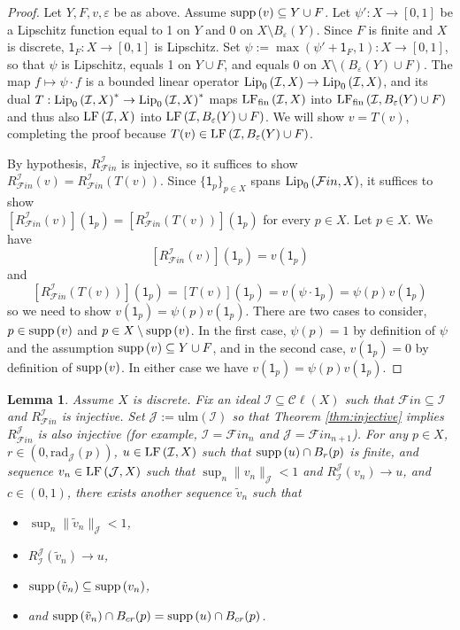 \documentclass[12pt]{amsart}
\newtheorem{lemma}[theorem]{Lemma}
\theoremstyle{definition}
\numberwithin{equation}{section}
\def \F {\mathcal{F}in}
\def \I {\mathcal{I}}
\def \J {\mathcal{J}}
\def \sbs {\subseteq}
\def \eps {\varepsilon}
\def \one {\mathsf{1}}
\newcommand{\Cl}[1]{\mathcal{C}\ell\left(#1\right)}
\newcommand{\rad}[2]{\mathrm{rad}_{#1}\left(#2\right)}
\newcommand{\ulm}[1]{\mathrm{ulm}\left(#1\right)}
\begin{document}
\begin{proof}
Let $Y,F,v,\eps$ be as above. Assume $\supp{v} \sbs Y \cup F$. Let $\psi': X \to [0,1]$ be a Lipschitz function equal to 1 on $Y$ and 0 on $X \setminus B_{\eps}(Y)$. Since $F$ is finite and $X$ is discrete, $\one_F: X \to [0,1]$ is Lipschitz. Set $\psi := \max(\psi'+\one_F,1): X \to [0,1]$, so that $\psi$ is Lipschitz, equals 1 on $Y \cup F$, and equals 0 on $X \setminus (B_{\eps}(Y) \cup F)$. The map $f \mapsto \psi \cdot f$ is a bounded linear operator $\Lip{\I}{X} \to \Lip{\I}{X}$, and its dual $T: \Lip{\I}{X}^* \to \Lip{\I}{X}^*$ maps $\LFf{\I}{X}$ into $\LFf{\I}{B_{\eps}(Y) \cup F}$ and thus also $\LF{\I}{X}$ into $\LF{\I}{B_{\eps}(Y) \cup F}$. We will show $v = T(v)$, completing the proof because $T(v) \in \LF{\I}{B_{\eps}(Y) \cup F}$.

By hypothesis, $R^\I_{\F}$ is injective, so it suffices to show $R^\I_{\F}(v) = R^\I_{\F}(T(v))$. Since $\{\one_p\}_{p \in X}$ spans $\Lip{\F}{X}$, it suffices to show \\ $[R^\I_{\F}(v)](\one_p) = [R^\I_{\F}(T(v))](\one_p)$ for every $p \in X$. Let $p \in X$. We have
$$[R^\I_{\F}(v)](\one_p) = v(\one_p)$$
and
$$[R^\I_{\F}(T(v))](\one_p) = [T(v)](\one_p) = v(\psi \cdot \one_p) = \psi(p)v(\one_p)$$
so we need to show $v(\one_p) = \psi(p)v(\one_p)$. There are two cases to consider, $p \in \supp{v}$ and $p \in X \setminus \supp{v}$. In the first case, $\psi(p) = 1$ by definition of $\psi$ and the assumption $\supp{v} \sbs Y \cup F$, and in the second case, $v(\one_p) = 0$ by definition of $\supp{v}$. In either case we have $v(\one_p) = \psi(p)v(\one_p)$.
\end{proof}

\begin{lemma} \label{lem:sequence1}
Assume $X$ is discrete. Fix an ideal $\I \sbs \Cl{X}$ such that $\F \sbs \I$ and $R^\I_{\F}$ is injective. Set $\J := \ulm{\I}$ so that Theorem \ref{thm:injective} implies $R^\J_{\F}$ is also injective (for example, $\I = \F_n$ and $\J = \F_{n+1}$). For any $p \in X$, $r \in (0,\rad{\J}{p})$, $u \in \LF{\I}{X}$ such that $\supp{u} \cap B_{r}(p)$ is finite, and sequence $v_n \in \LF{\J}{X}$ such that $\sup_n \|v_n\|_\J < 1$ and $R^\J_\I(v_n) \to u$, and $c \in (0,1)$, there exists another sequence $\tilde{v}_n$ such that
\begin{itemize}
\item $\sup_n \|\tilde{v}_n\|_\J < 1$,
\item $R^\J_\I(\tilde{v}_n) \to u$,
\item $\supp{\tilde{v}_n} \sbs \supp{v_n}$,
\item and $\supp{\tilde{v}_n} \cap B_{cr}(p) = \supp{u} \cap B_{cr}(p)$.
\end{itemize}
\end{lemma}
\end{document}
